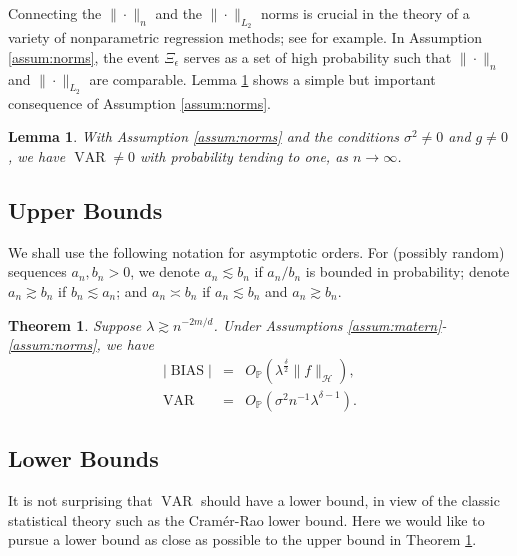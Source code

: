 \documentclass[12pt]{article}
\theoremstyle{plain}
\newtheorem{theorem}{Theorem}
\newtheorem{lemma}{Lemma}
\theoremstyle{remark}
\begin{document}
Connecting the $\|\cdot\|_n$ and the $\|\cdot\|_{L_2}$ norms is crucial in the theory of a variety of nonparametric regression methods; see \cite{huang2003local,geer2000empirical} for example. In Assumption \ref{assum:norms}, the event $\Xi_\epsilon$ serves as a set of high probability such that $\|\cdot\|_n$ and $\|\cdot\|_{L_2}$ are comparable. Lemma \ref{lemma:var} shows a simple but important consequence of Assumption \ref{assum:norms}.

\begin{lemma}\label{lemma:var}
    With Assumption \ref{assum:norms} and the conditions $\sigma^2\neq 0$ and $g\neq 0$, we have $\operatorname{VAR}\neq 0$ with probability tending to one, as $n\rightarrow\infty$.
\end{lemma}








\subsection{Upper Bounds}\label{sec:upper}

We shall use the following notation for asymptotic orders. For (possibly random) sequences $a_n,b_n>0$, we denote $a_n\lesssim b_n$ if $a_n/b_n$ is bounded in probability; denote $a_n\gtrsim b_n$ if $b_n\lesssim a_n$; and $a_n\asymp b_n$ if $a_n\lesssim b_n$ and $a_n\gtrsim b_n$.

\begin{theorem}\label{Coro:rate}
Suppose $\lambda\gtrsim n^{-{2m}/d}$. Under Assumptions \ref{assum:matern}-\ref{assum:norms}, we have
\begin{eqnarray}
    |\operatorname{BIAS}|&=&O_\mathbb{P}(\lambda^{\frac{\delta}{2}}\|f\|_\mathcal{H}),\label{BIASupper}\\
    \operatorname{VAR}&=&O_\mathbb{P}(\sigma^2n^{-1}\lambda^{\delta-1}).\label{VARupper}
\end{eqnarray}
\end{theorem}


\subsection{Lower Bounds}\label{sec:lower}

It is not surprising that $\operatorname{VAR}$ should have a lower bound, in view of the classic statistical theory such as the Cram\'er-Rao lower bound.
Here we would like to pursue a lower bound as close as possible to the upper bound in Theorem \ref{Coro:rate}.
\end{document}
